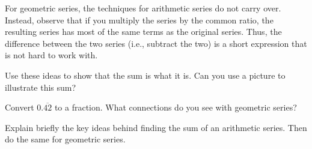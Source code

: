 For geometric series, the techniques for arithmetic series do not carry over.  Instead, observe that if you multiply the series by the common ratio, the resulting series has most of the same terms as the original series.  Thus, the difference between the two series (i.e., subtract the two) is a short expression that is not hard to work with.  

\begin{question}
Use these ideas to show that the sum is what it is.  Can you use a picture to illustrate this sum?    
\end{question}
\QM

\begin{question}
Convert $0.\overline{42}$ to a fraction.  What connections do you see with geometric series?  
\end{question}
\QM

\begin{question}
Explain briefly the key ideas behind finding the sum of an arithmetic series. Then do the same for geometric series.  
\end{question}
\QM


